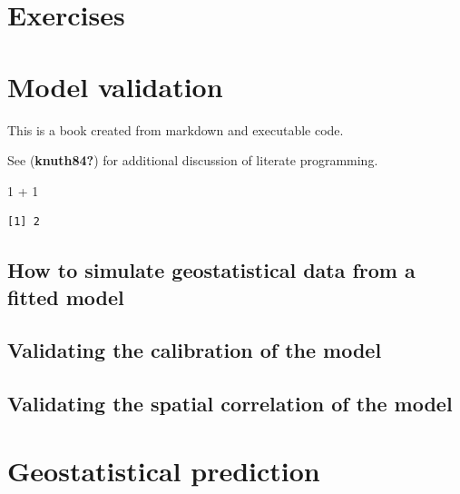 \documentclass[
  letterpaper,
]{krantz}
\newenvironment{Shaded}{\begin{snugshade}}{\end{snugshade}}
\newcommand{\DecValTok}[1]{\textcolor[rgb]{0.68,0.00,0.00}{#1}}
\newcommand{\SpecialCharTok}[1]{\textcolor[rgb]{0.37,0.37,0.37}{#1}}
\begin{document}
\hypertarget{exercises}{%
\chapter{Exercises}\label{exercises}}


\hypertarget{sec-validation}{%
\chapter{Model validation}\label{sec-validation}}

This is a book created from markdown and executable code.

See (\textbf{knuth84?}) for additional discussion of literate
programming.

\begin{Shaded}
\begin{Highlighting}[]
\DecValTok{1} \SpecialCharTok{+} \DecValTok{1}
\end{Highlighting}
\end{Shaded}

\begin{verbatim}
[1] 2
\end{verbatim}

\hypertarget{how-to-simulate-geostatistical-data-from-a-fitted-model}{%
\section{How to simulate geostatistical data from a fitted
model}\label{how-to-simulate-geostatistical-data-from-a-fitted-model}}

\hypertarget{validating-the-calibration-of-the-model}{%
\section{Validating the calibration of the
model}\label{validating-the-calibration-of-the-model}}

\hypertarget{validating-the-spatial-correlation-of-the-model}{%
\section{Validating the spatial correlation of the
model}\label{validating-the-spatial-correlation-of-the-model}}


\hypertarget{sec-geo-prediction}{%
\chapter{Geostatistical prediction}\label{sec-geo-prediction}}
\end{document}
